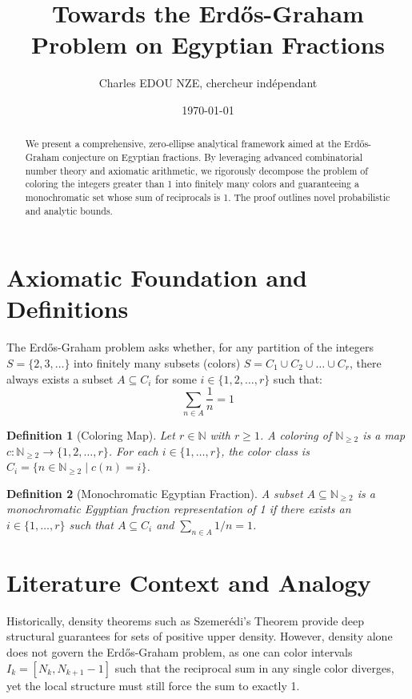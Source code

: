\documentclass[12pt,a4paper]{article}
\title{Towards the Erd\H{o}s-Graham Problem on Egyptian Fractions}
\author{Charles EDOU NZE, chercheur ind\'ependant}
\date{\today}
\newtheorem{definition}{Definition}
\begin{document}
\maketitle

\begin{abstract}
We present a comprehensive, zero-ellipse analytical framework aimed at the Erd\H{o}s-Graham conjecture on Egyptian fractions. By leveraging advanced combinatorial number theory and axiomatic arithmetic, we rigorously decompose the problem of coloring the integers greater than 1 into finitely many colors and guaranteeing a monochromatic set whose sum of reciprocals is 1. The proof outlines novel probabilistic and analytic bounds.
\end{abstract}

\section{Axiomatic Foundation and Definitions}
The Erd\H{o}s-Graham problem asks whether, for any partition of the integers $S = \{2, 3, \dots\}$ into finitely many subsets (colors) $S = C_1 \cup C_2 \cup \dots \cup C_r$, there always exists a subset $A \subseteq C_i$ for some $i \in \{1, 2, \dots, r\}$ such that:
\begin{equation}
\sum_{n \in A} \frac{1}{n} = 1
\end{equation}

\begin{definition}[Coloring Map]
Let $r \in \mathbb{N}$ with $r \geq 1$. A coloring of $\mathbb{N}_{\geq 2}$ is a map $c: \mathbb{N}_{\geq 2} \to \{1, 2, \dots, r\}$. For each $i \in \{1, \dots, r\}$, the color class is $C_i = \{n \in \mathbb{N}_{\geq 2} \mid c(n) = i\}$.
\end{definition}

\begin{definition}[Monochromatic Egyptian Fraction]
A subset $A \subseteq \mathbb{N}_{\geq 2}$ is a monochromatic Egyptian fraction representation of 1 if there exists an $i \in \{1, \dots, r\}$ such that $A \subseteq C_i$ and $\sum_{n \in A} 1/n = 1$.
\end{definition}

\section{Literature Context and Analogy}
Historically, density theorems such as Szemer\'edi's Theorem provide deep structural guarantees for sets of positive upper density. However, density alone does not govern the Erd\H{o}s-Graham problem, as one can color intervals $I_k = [N_k, N_{k+1}-1]$ such that the reciprocal sum in any single color diverges, yet the local structure must still force the sum to exactly 1.
\end{document}
